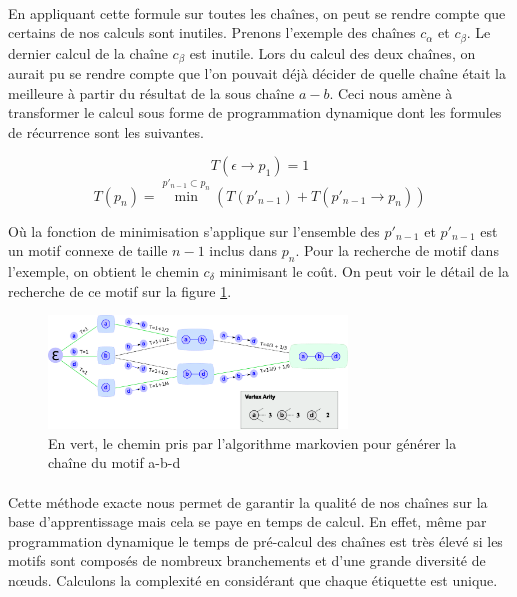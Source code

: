 \documentclass[12pt,french,twoside]{report}
\begin{document}
\paragraph{}En appliquant cette formule sur toutes les chaînes, on peut se rendre compte que certains de nos calculs sont inutiles.
Prenons l'exemple des chaînes $c_{\alpha}$ et $c_{\beta}$. Le dernier calcul de la chaîne $c_{\beta}$ est inutile. Lors
du calcul des deux chaînes, on aurait pu se rendre compte que l'on pouvait déjà décider de quelle chaîne était la meilleure à
partir du résultat de la sous chaîne $a-b$. Ceci nous amène à transformer le calcul sous forme de programmation dynamique dont les
formules de récurrence sont les suivantes.


\begin{equation}
 T(\epsilon \rightarrow p_1) = 1
\end{equation}
\begin{equation}
 T(p_n) = \min^{p'_{n-1} \subset p_n} (T(p'_{n-1}) + T(p'_{n-1} \rightarrow p_n))
\end{equation}

Où la fonction de minimisation s'applique sur l'ensemble des $p'_{n-1}$ et $p'_{n-1}$ est un motif connexe de taille $n-1$ inclus
dans $p_n$. Pour la recherche de motif dans l'exemple, on obtient le chemin $c_{\delta}$ minimisant le coût. On peut voir le
détail de la recherche de ce motif sur la figure \ref{markov}.

\begin{figure}
  \includegraphics[width=300px]{Figures/s2m/indexation/markov.png}
  \caption{\label{markov}En vert, le chemin pris par l'algorithme markovien pour générer la chaîne du motif a-b-d}
\end{figure}

\paragraph{}Cette méthode exacte nous permet de garantir la qualité de nos chaînes sur la base d'apprentissage mais cela se paye en temps de calcul.
En effet, même par programmation dynamique le temps de pré-calcul des chaînes est très élevé si les motifs sont composés de nombreux branchements et d'une grande diversité de n\oe{}uds.
Calculons la complexité en considérant que chaque étiquette est unique.
\end{document}
